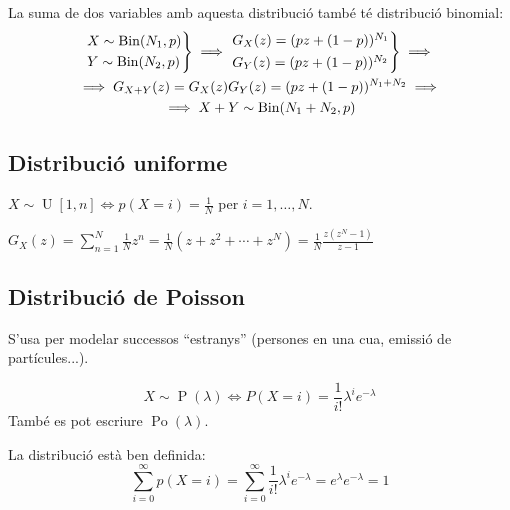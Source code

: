 \begin{obs} La suma de dos variables amb aquesta distribució també té distribució binomial:
    \begin{gather*}
    \begin{rcases*} X \sim \operatorname{Bin}(N_1,p) \\ Y \sim \operatorname{Bin}(N_2,p) \end{rcases*} \implies
    \begin{rcases*} G_X(z) = (pz+(1-p))^{N_1} \\ G_Y(z) = (pz+(1-p))^{N_2} \end{rcases*}
    \implies \\
    \implies G_{X+Y}(z) = G_X(z)G_Y(z) = (pz+(1-p))^{N_1+N_2} \implies \\
    \implies X+Y \sim \operatorname{Bin}(N_1+N_2,p)
    \end{gather*}
\end{obs}

\subsection*{Distribució uniforme}

\begin{defi}
    $X \sim \operatorname{U}[1,n] \iff p(X=i)=\frac{1}{N}$ per $i = 1,\dots,N$.
\end{defi}

\begin{prop}
    $G_X(z) = \sum_{n=1}^N \frac{1}{N}z^n = \frac{1}{N}(z+z^2+\cdots+z^N) = \frac{1}{N}\frac{z(z^N-1)}{z-1}$
\end{prop}

\subsection*{Distribució de Poisson}

S'usa per modelar successos ``estranys'' (persones en una cua, emissió de partícules...).

\begin{defi}
    \[X \sim \operatorname{P}(\lambda) \iff P(X=i) = \frac{1}{i!}\lambda^i e^{-\lambda}\]
    També es pot escriure $\operatorname{Po}(\lambda)$.
\end{defi}

\begin{obs}
    La distribució està ben definida:
    \[\sum_{i=0}^\infty p(X=i) = \sum_{i=0}^\infty \frac{1}{i!}\lambda^i e^{-\lambda} = e^\lambda e^{-\lambda} = 1\]
\end{obs}

